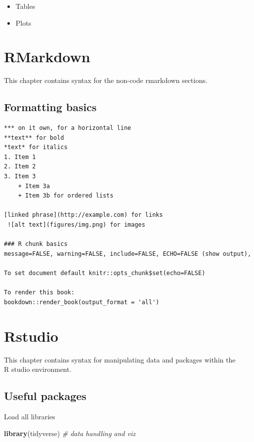 \documentclass[
]{article}
\newenvironment{Shaded}{\begin{snugshade}}{\end{snugshade}}
\newcommand{\CommentTok}[1]{\textcolor[rgb]{0.56,0.35,0.01}{\textit{#1}}}
\newcommand{\FunctionTok}[1]{\textcolor[rgb]{0.13,0.29,0.53}{\textbf{#1}}}
\newcommand{\NormalTok}[1]{#1}
\providecommand{\tightlist}{%
  \setlength{\itemsep}{0pt}\setlength{\parskip}{0pt}}
\begin{document}
\begin{itemize}
  \begin{itemize}
  \tightlist
  \item
    Tables
  \item
    Plots
  \end{itemize}
\end{itemize}

\hypertarget{rmarkdown}{%
\section{RMarkdown}\label{rmarkdown}}

This chapter contains syntax for the non-code rmarkdown sections.

\hypertarget{formatting-basics}{%
\subsection{Formatting basics}\label{formatting-basics}}

\begin{verbatim}
*** on it own, for a horizontal line
**text** for bold
*text* for italics
1. Item 1
2. Item 2
3. Item 3
    + Item 3a
    + Item 3b for ordered lists
    
[linked phrase](http://example.com) for links
 ![alt text](figures/img.png) for images

### R chunk basics 
message=FALSE, warning=FALSE, include=FALSE, ECHO=FALSE (show output), 

To set document default knitr::opts_chunk$set(echo=FALSE) 

To render this book:
bookdown::render_book(output_format = 'all')
\end{verbatim}

\hypertarget{rstudio}{%
\section{Rstudio}\label{rstudio}}

This chapter contains syntax for manipulating data and packages within the\\
R studio environment.

\hypertarget{useful-packages}{%
\subsection{Useful packages}\label{useful-packages}}

Load all libraries

\begin{Shaded}
\begin{Highlighting}[]
\FunctionTok{library}\NormalTok{(tidyverse) }\CommentTok{\# data handling and viz}
\end{Highlighting}
\end{Shaded}
\end{document}

